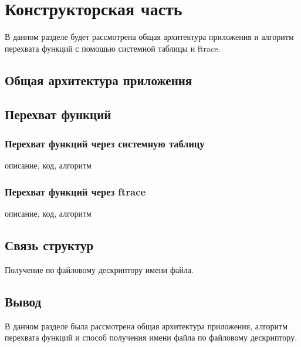 \chapter{Конструкторская часть}
    В данном разделе будет рассмотрена общая архитектура приложения и 
    алгоритм перехвата функций с помошью системной таблицы и ftrace.

\section{Общая архитектура приложения}

\section{Перехват функций}

    \subsection{Перехват функций через системную таблицу}
        описание, код, алгоритм

    \subsection{Перехват функций через ftrace}
        описание, код, алгоритм

\section{Связь структур}
    Получение по файловому дескриптору имени файла.

\section{Вывод}
    В данном разделе была рассмотрена общая архитектура приложения, алгоритм перехвата функций и 
    способ получения имени файла по файловому дескриптору.

\pagebreak